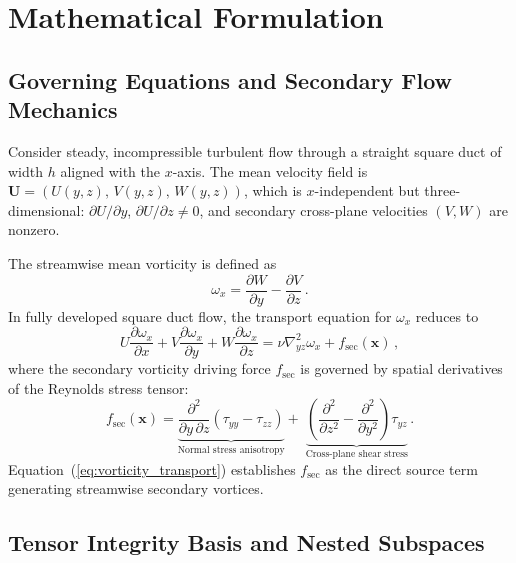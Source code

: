 \documentclass[preprint,aps,prb,longbibliography,superscriptaddress]{revtex4-2}
\newcommand{\bx}{\mathbf{x}}
\newcommand{\bU}{\mathbf{U}}
\newcommand{\fsec}{f_{\text{sec}}}
\begin{document}
\section{Mathematical Formulation}\label{sec:math}

\subsection{Governing Equations and Secondary Flow Mechanics}
\label{sec:governing}

Consider steady, incompressible turbulent flow through a straight square duct
of width $h$ aligned with the $x$-axis. The mean velocity field is
$\bU = (U(y,z),\, V(y,z),\, W(y,z))$, which is $x$-independent but
three-dimensional: $\partial U/\partial y$, $\partial U/\partial z \neq 0$,
and secondary cross-plane velocities $(V,W)$ are nonzero.

The streamwise mean vorticity is defined as
\begin{equation}\label{eq:vorticity}
  \omega_x = \frac{\partial W}{\partial y} - \frac{\partial V}{\partial z}\,.
\end{equation}
In fully developed square duct flow, the transport equation for $\omega_x$
reduces to
\begin{equation}\label{eq:vorticity_transport}
  U\frac{\partial \omega_x}{\partial x}
  + V\frac{\partial \omega_x}{\partial y}
  + W\frac{\partial \omega_x}{\partial z}
  = \nu \nabla_{yz}^2 \omega_x + \fsec(\bx)\,,
\end{equation}
where the secondary vorticity driving force $\fsec$ is governed by spatial
derivatives of the Reynolds stress tensor:
\begin{equation}\label{eq:fsec}
  \fsec(\bx) =
  \underbrace{\frac{\partial^2}{\partial y\,\partial z}
    (\tau_{yy} - \tau_{zz})}_{\text{Normal stress anisotropy}}
  +\;
  \underbrace{\left(\frac{\partial^2}{\partial z^2}
    - \frac{\partial^2}{\partial y^2}\right)\tau_{yz}}_{\text{Cross-plane shear stress}}\,.
\end{equation}
Equation~(\ref{eq:vorticity_transport}) establishes $\fsec$ as the direct
source term generating streamwise secondary vortices.

\subsection{Tensor Integrity Basis and Nested Subspaces}
\label{sec:basis}
\end{document}
